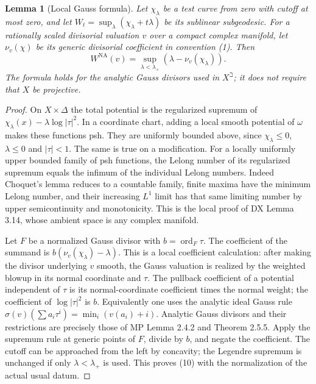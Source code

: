\documentclass[11pt]{article}
\newtheorem{lemma}[theorem]{Lemma}
\newcommand{\NA}{\mathrm{NA}}
\begin{document}
\begin{lemma}[Local Gauss formula]\label{gauss}
Let $\chi_\lambda$ be a test curve from zero with cutoff at most zero,
and let $W_t=\sup_\lambda(\chi_\lambda+t\lambda)$ be its sublinear
subgeodesic. For a rationally scaled divisorial valuation $v$ over a compact complex
manifold, let $\nu_v(\chi)$ be its generic divisorial coefficient in
convention (1). Then
\[
 W^\NA(v)=\sup_{\lambda<\lambda_+}
                          (\lambda-\nu_v(\chi_\lambda)).    \tag{10}
\]
The formula holds for the analytic Gauss divisors used in $X^\beth$;
it does not require that $X$ be projective.
\end{lemma}
\begin{proof}
On $X\times\Delta$ the total potential is the regularized supremum
of $\chi_\lambda(x)-\lambda\log|\tau|^2$. In a coordinate chart,
adding a local smooth potential of $\omega$ makes these functions
psh. They are uniformly bounded above, since $\chi_\lambda\le0$,
$\lambda\le0$ and $|\tau|<1$. The same is true on a modification.
For a locally uniformly upper bounded family of psh functions,
the Lelong number of its regularized supremum equals the infimum of
the individual Lelong numbers. Indeed Choquet's lemma reduces to a
countable family, finite maxima have the minimum Lelong number, and
their increasing $L^1$ limit has that same limiting number by upper
semicontinuity and monotonicity. This is the local proof of DX
Lemma 3.14, whose ambient space is any complex manifold.

Let $F$ be a normalized Gauss divisor with $b=\operatorname{ord}_F\tau$.
The coefficient of the summand is
$b(\nu_v(\chi_\lambda)-\lambda)$. This is a local coefficient
calculation: after making the divisor underlying $v$ smooth, the
Gauss valuation is realized by the weighted blowup in its normal
coordinate and $\tau$. The pullback coefficient of a potential
independent of $\tau$ is its normal-coordinate coefficient times
the normal weight; the coefficient of $\log|\tau|^2$ is $b$.
Equivalently one uses the analytic ideal Gauss rule
$\sigma(v)(\sum a_i\tau^i)=\min_i(v(a_i)+i)$.
Analytic Gauss divisors and their restrictions are precisely those
of MP Lemma 2.4.2 and Theorem 2.5.5. Apply the supremum rule at
generic points of $F$, divide by $b$, and negate the coefficient.
The cutoff can be approached from the left by concavity; the
Legendre supremum is unchanged if only $\lambda<\lambda_+$ is used.
This proves (10) with the normalization of the actual usual datum.
\end{proof}
\end{document}
